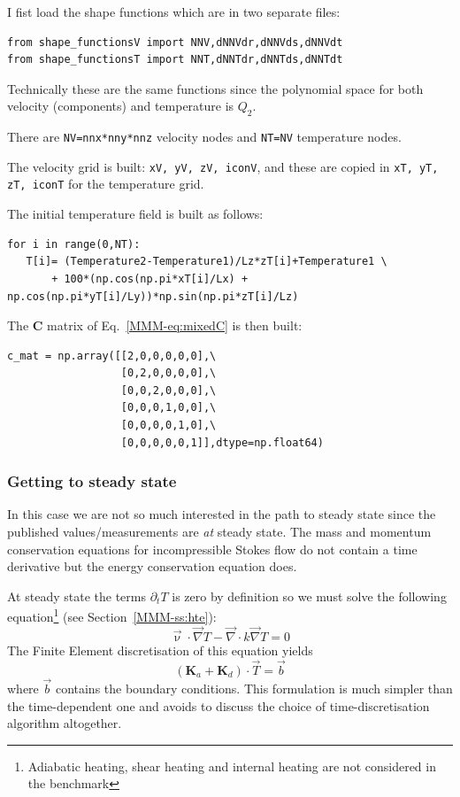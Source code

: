 I fist load the shape functions which are in two separate files:

\begin{lstlisting}
from shape_functionsV import NNV,dNNVdr,dNNVds,dNNVdt
from shape_functionsT import NNT,dNNTdr,dNNTds,dNNTdt
\end{lstlisting}
Technically these are the same functions since the polynomial space for 
both velocity (components) and temperature is $Q_2$.

There are \lstinline{NV=nnx*nny*nnz} velocity nodes and 
\lstinline{NT=NV} temperature nodes.

The velocity grid is built: \lstinline{xV, yV, zV, iconV}, and 
these are copied in \lstinline{xT, yT, zT, iconT} for the temperature grid.  

The initial temperature field is built as follows:
\begin{lstlisting}
for i in range(0,NT):
   T[i]= (Temperature2-Temperature1)/Lz*zT[i]+Temperature1 \
       + 100*(np.cos(np.pi*xT[i]/Lx) + np.cos(np.pi*yT[i]/Ly))*np.sin(np.pi*zT[i]/Lz)
\end{lstlisting}

The ${\bm C}$ matrix of Eq.~\eqref{MMM-eq:mixedC} is then built:
\begin{lstlisting}
c_mat = np.array([[2,0,0,0,0,0],\
                  [0,2,0,0,0,0],\
                  [0,0,2,0,0,0],\
                  [0,0,0,1,0,0],\
                  [0,0,0,0,1,0],\
                  [0,0,0,0,0,1]],dtype=np.float64) 
\end{lstlisting}

\subsubsection{Getting to steady state}  

In this case we are not so much interested in the path to steady state since 
the published values/measurements are {\it at} steady state.
The mass and momentum conservation equations for incompressible Stokes flow do not 
contain a time derivative but the energy conservation equation does. 

At steady state the terms $\partial_t T$ is zero by definition so we must solve
the following equation\footnote{Adiabatic heating, shear heating and internal heating 
are not considered in the benchmark} (see Section~\ref{MMM-ss:hte}):
\begin{equation}
\vec{\upnu}\cdot\vec\nabla T - {\vec \nabla} \cdot k {\vec \nabla} T = 0
\end{equation}
The Finite Element discretisation of this equation yields 
\[
({\bm K}_a + {\bm K}_d) \cdot \vec{T} = \vec{b}
\]
where $\vec{b}$ contains the boundary conditions.
This formulation is much simpler than the time-dependent one and avoids to discuss the choice
of time-discretisation algorithm altogether. 

